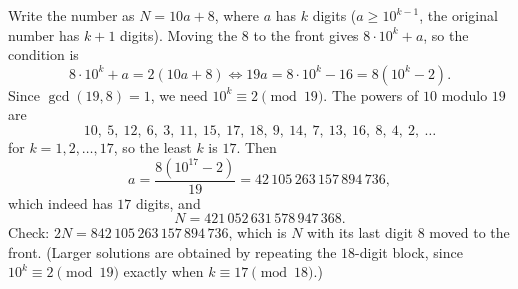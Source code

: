 Write the number as $N=10a+8$, where $a$ has $k$ digits ($a\ge10^{k-1}$, the original number has $k+1$ digits). Moving the $8$ to the front gives $8\cdot10^k+a$, so the condition is
\[
8\cdot10^k+a=2(10a+8)\iff19a=8\cdot10^k-16=8\left(10^k-2\right).
\]
Since $\gcd(19,8)=1$, we need $10^k\equiv2\pmod{19}$. The powers of $10$ modulo $19$ are
\[
10,\ 5,\ 12,\ 6,\ 3,\ 11,\ 15,\ 17,\ 18,\ 9,\ 14,\ 7,\ 13,\ 16,\ 8,\ 4,\ 2,\ \dots
\]
for $k=1,2,\dots,17$, so the least $k$ is $17$. Then
\[
a=\dfrac{8\left(10^{17}-2\right)}{19}=42\,105\,263\,157\,894\,736,
\]
which indeed has $17$ digits, and
\[
N=\boxed{421\,052\,631\,578\,947\,368}.
\]
Check: $2N=842\,105\,263\,157\,894\,736$, which is $N$ with its last digit $8$ moved to the front. (Larger solutions are obtained by repeating the $18$-digit block, since $10^k\equiv2\pmod{19}$ exactly when $k\equiv17\pmod{18}$.)
